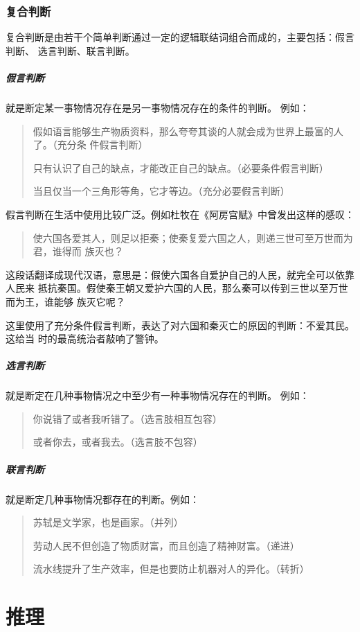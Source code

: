 \documentclass[final,oneside]{ctexbook}
\newenvironment{equotation}{\begin{quotation}\kaishu}{\end{quotation}}
\begin{document}
\subsubsection{复合判断}

复合判断是由若干个简单判断通过一定的逻辑联结词组合而成的，主要包括：假言判断、
选言判断、联言判断。

\subparagraph{假言判断}就是断定某一事物情况存在是另一事物情况存在的条件的判断。
例如：
\begin{equotation}
  假如语言能够生产物质资料，那么夸夸其谈的人就会成为世界上最富的人了。（充分条
  件假言判断）

  只有认识了自己的缺点，才能改正自己的缺点。（必要条件假言判断）

  当且仅当一个三角形等角，它才等边。（充分必要假言判断）
\end{equotation}

假言判断在生活中使用比较广泛。例如杜牧在《阿房宫赋》中曾发出这样的感叹：
\begin{equotation}
  使六国各爱其人，则足以拒秦；使秦复爱六国之人，则递三世可至万世而为君，谁得而
  族灭也？
\end{equotation}
这段话翻译成现代汉语，意思是：假使六国各自爱护自己的人民，就完全可以依靠人民来
抵抗秦国。假使秦王朝又爱护六国的人民，那么秦可以传到三世以至万世而为王，谁能够
族灭它呢？

这里使用了充分条件假言判断，表达了对六国和秦灭亡的原因的判断：不爱其民。这给当
时的最高统治者敲响了警钟。

\subparagraph{选言判断}就是断定在几种事物情况之中至少有一种事物情况存在的判断。
例如：
\begin{equotation}
  你说错了或者我听错了。（选言肢相互包容）

  或者你去，或者我去。（选言肢不包容）
\end{equotation}

\subparagraph{联言判断}就是断定几种事物情况都存在的判断。例如：

\begin{equotation}
  苏轼是文学家，也是画家。（并列）

  劳动人民不但创造了物质财富，而且创造了精神财富。（递进）

  流水线提升了生产效率，但是也要防止机器对人的异化。（转折）
\end{equotation}

\section{推理}
\end{document}
